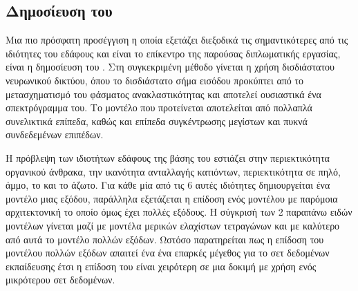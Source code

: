\subsection{Δημοσίευση του }
Μια πιο πρόσφατη προσέγγιση η οποία εξετάζει διεξοδικά τις σημαντικότερες από τις ιδιότητες του εδάφους και είναι το επίκεντρο της παρούσας διπλωματικής εργασίας, είναι η δημοσίευση του  \cite{padarian_lucas_soil}. Στη συγκεκριμένη μέθοδο γίνεται η χρήση δισδιάστατου νευρωνικού δικτύου, όπου το δισδιάστατο σήμα εισόδου προκύπτει από το μετασχηματισμό  του φάσματος ανακλαστικότητας και αποτελεί ουσιαστικά ένα σπεκτρόγραμμα του. Το μοντέλο που προτείνεται αποτελείται από πολλαπλά συνελικτικά επίπεδα, καθώς και επίπεδα συγκέντρωσης μεγίστων και πυκνά συνδεδεμένων επιπέδων.

Η πρόβλεψη των ιδιοτήτων εδάφους της βάσης του  εστιάζει στην περιεκτικότητα οργανικού άνθρακα, την ικανότητα ανταλλαγής κατιόντων, περιεκτικότητα σε πηλό, άμμο, το  και το άζωτο. Για κάθε μία από τις 6 αυτές ιδιότητες δημιουργείται ένα μοντέλο μιας εξόδου, παράλληλα εξετάζεται η επίδοση ενός μοντέλου με παρόμοια αρχιτεκτονική το οποίο όμως έχει πολλές εξόδους. Η σύγκρισή των 2 παραπάνω ειδών μοντέλων γίνεται μαζί με μοντέλα μερικών ελαχίστων τετραγώνων και  με καλύτερο από αυτά το μοντέλο πολλών εξόδων. Ωστόσο παρατηρείται πως η επίδοση του μοντέλου πολλών εξόδων απαιτεί ένα ένα επαρκές μέγεθος για το σετ δεδομένων εκπαίδευσης έτσι η επίδοση του είναι χειρότερη σε μια δοκιμή με χρήση ενός μικρότερου σετ δεδομένων.
